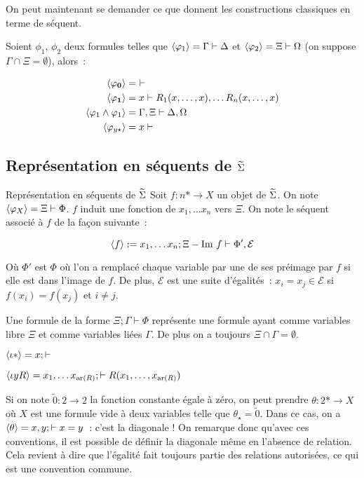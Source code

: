 On peut maintenant se demander ce que donnent les constructions classiques en terme
de séquent.

\begin{lem}\label{seqStandarts}
    Soient $\phi_1$, $\phi_2$ deux formules telles que $\langle{\varphi_1}\rangle = \Gamma\vdash\Delta$
    et $\langle{\varphi_2}\rangle = \Xi\vdash\Omega$ (on suppose $\Gamma\cap\Xi=\emptyset$), alors~:

    \begin{align*}
        \langle{\varphi_\mathbf{0}}\rangle &=~\vdash \\
        \langle{\varphi_\mathbf{1}}\rangle &= x\vdash R_1(x,\dots, x),\dots R_n(x, \dots, x) \\
        \langle{\varphi_1\wedge\varphi_1}\rangle &= \Gamma,\Xi\vdash\Delta,\Omega \\
        \langle{\varphi_{y\star}}\rangle &= x\vdash
    \end{align*}
\end{lem}

\subsection{Représentation en séquents de $\widetilde{\Sigma}$}\label{seqTSigma}

\begin{defi}{Représentation en séquents de $\widetilde{\Sigma}$}\label{commaSeq}
    Soit $f : n\ast\rightarrow X$ un objet de $\widetilde{\Sigma}$. On note
    $\langle{\varphi_X}\rangle = \Xi\vdash\Phi$. $f$ induit une fonction de $x_1,\dots x_n$ vers $\Xi$.
    On note le séquent associé à $f$ de la façon suivante~:

    \[ \langle{f}\rangle := x_1, \dots x_n; \Xi - \text{Im } f\vdash \Phi',\mathcal{E} \]

    Où $\Phi'$ est $\Phi$ où l'on a remplacé chaque variable par une de ses préimage
    par $f$ si elle est dans l'image de $f$. De plus, $\mathcal{E}$ est une suite
    d'égalités~: $x_i=x_j\in\mathcal{E}$ si $f(x_i) = f(x_j)$ et $i\neq j$.

    Une formule de la forme $\Xi;\Gamma\vdash \Phi$ représente une formule ayant comme
    variables libre $\Xi$ et comme variables liées $\Gamma$. De plus on a toujours
    $\Xi\cap\Gamma=\emptyset$.
\end{defi}

\begin{exs}
    \item $\langle{\iota\ast}\rangle = x;\vdash$
    \item $\langle{\iota yR}\rangle = x_1,\dots x_{\text{ar}(R)};\vdash R(x_1, \dots, x_{\text{ar}(R)})$
    \item Si on note $\tilde{0} : 2\rightarrow 2$ la fonction constante égale à
        zéro, on peut prendre $\theta : 2\ast\rightarrow X$ où $X$ est une formule
        vide à deux variables telle que $\theta_\star = \tilde{0}$. Dans ce cas, on
        a $\langle{\theta}\rangle = x,y;\vdash x = y$~: c'est la diagonale ! On remarque donc
        qu'avec ces conventions, il est possible de définir la diagonale même en
        l'absence de relation. Cela revient à dire que l'égalité fait toujours
        partie des relations autorisées, ce qui est une convention commune.
\end{exs}


